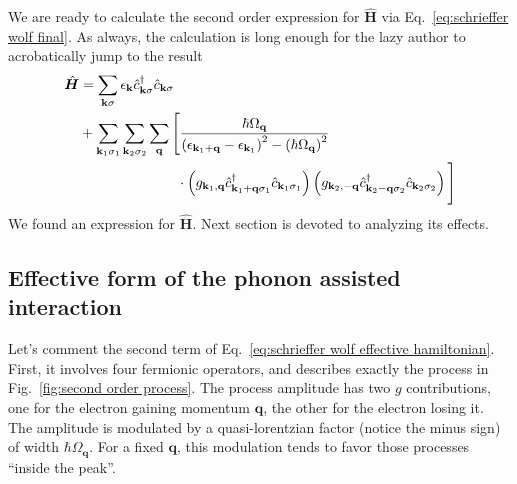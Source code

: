 We are ready to calculate the second order expression for $\hat{\bm H}$ via Eq.~\eqref{eq:schrieffer wolf final}. As always, the calculation is long enough for the lazy author to acrobatically jump to the result
\begin{equation}\label{eq:schrieffer wolf effective hamiltonian}
\begin{aligned}
	\hat{\bm H} &= \sum_{\mathbf{k}\sigma} \epsilon_{\mathbf{k}} \hat{c}_{\mathbf{k}\sigma}^\dagger \hat{c}_{\mathbf{k}\sigma} \\
	&+ \sum_{\mathbf{k}_1 \sigma_1} \sum_{\mathbf{k}_2 \sigma_2} \sum_\mathbf{q} \Bigg[ \frac{
		\hbar\Omega_\mathbf{q}
	}{
		\left({\epsilon_{\mathbf{k}_1+\mathbf{q}} - \epsilon_{\mathbf{k}_1}}\right)^2 - \left({\hbar\Omega_\mathbf{q}}\right)^2
	} \\
	&\hspace{7em} \cdot \left({g_{\mathbf{k}_1,\mathbf{q}} \hat{c}_{\mathbf{k}_1+\mathbf{q}\sigma_1}^\dagger \hat{c}_{\mathbf{k}_1\sigma_1} }\right)
	\left({g_{\mathbf{k}_2,-\mathbf{q}} \hat{c}_{\mathbf{k}_2-\mathbf{q}\sigma_2}^\dagger \hat{c}_{\mathbf{k}_2\sigma_2}}\right) \Bigg]
\end{aligned}
\end{equation}
We found an expression for $\hat{\bm H}$. Next section is devoted to analyzing its effects.

\subsection{Effective form of the phonon assisted interaction}

Let's comment the second term of Eq.~\eqref{eq:schrieffer wolf effective hamiltonian}. First, it involves four fermionic operators, and describes exactly the process in Fig.~\ref{fig:second order process}. The process amplitude has two $g$ contributions, one for the electron gaining momentum $\mathbf{q}$, the other for the electron losing it. The amplitude is modulated by a quasi-lorentzian factor (notice the minus sign) of width $\hbar\Omega_\mathbf{q}$. For a fixed $\mathbf{q}$, this modulation tends to favor those processes ``inside the peak''.

\begin{figure}
	\centering
	\caption{}
	\label{fig:quasi-lorentzian function bcs}
\end{figure}

